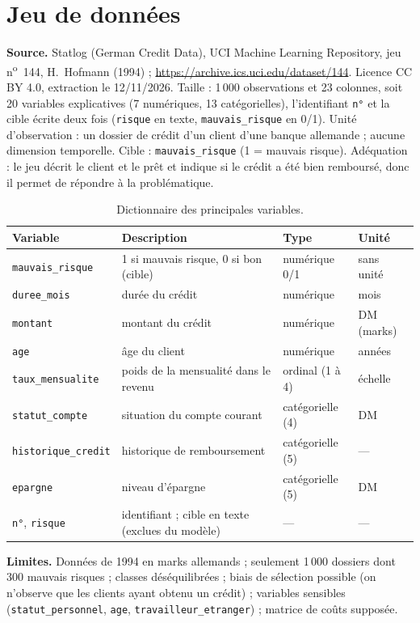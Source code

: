 \documentclass[11pt,a4paper]{article}
\newcommand{\code}[1]{\texttt{\small #1}}
\begin{document}
\section{Jeu de données}

\textbf{Source.} Statlog (German Credit Data), UCI Machine Learning Repository, jeu n\textsuperscript{o}~144, H.~Hofmann (1994) ; \url{https://archive.ics.uci.edu/dataset/144}. Licence CC BY 4.0, extraction le 12/11/2026. Taille : 1\,000 observations et 23 colonnes, soit 20 variables explicatives (7 numériques, 13 catégorielles), l'identifiant \code{n°} et la cible écrite deux fois (\code{risque} en texte, \code{mauvais\_risque} en 0/1). Unité d'observation : un dossier de crédit d'un client d'une banque allemande ; aucune dimension temporelle. Cible : \code{mauvais\_risque} (1 = mauvais risque). Adéquation : le jeu décrit le client et le prêt et indique si le crédit a été bien remboursé, donc il permet de répondre à la problématique.

\begin{table}[htbp]
\centering
\caption{Dictionnaire des principales variables.}
\small
\begin{tabular}{@{}llll@{}}
\toprule
\textbf{Variable} & \textbf{Description} & \textbf{Type} & \textbf{Unité}\\
\midrule
\code{mauvais\_risque} & 1 si mauvais risque, 0 si bon (cible) & numérique 0/1 & sans unité\\
\code{duree\_mois} & durée du crédit & numérique & mois\\
\code{montant} & montant du crédit & numérique & DM (marks)\\
\code{age} & âge du client & numérique & années\\
\code{taux\_mensualite} & poids de la mensualité dans le revenu & ordinal (1 à 4) & échelle\\
\code{statut\_compte} & situation du compte courant & catégorielle (4) & DM\\
\code{historique\_credit} & historique de remboursement & catégorielle (5) & ---\\
\code{epargne} & niveau d'épargne & catégorielle (5) & DM\\
\code{n°}, \code{risque} & identifiant ; cible en texte (exclues du modèle) & --- & ---\\
\bottomrule
\end{tabular}
\end{table}

\textbf{Limites.} Données de 1994 en marks allemands ; seulement 1\,000 dossiers dont 300 mauvais risques ; classes déséquilibrées ; biais de sélection possible (on n'observe que les clients ayant obtenu un crédit) ; variables sensibles (\code{statut\_personnel}, \code{age}, \code{travailleur\_etranger}) ; matrice de coûts supposée.
\end{document}
